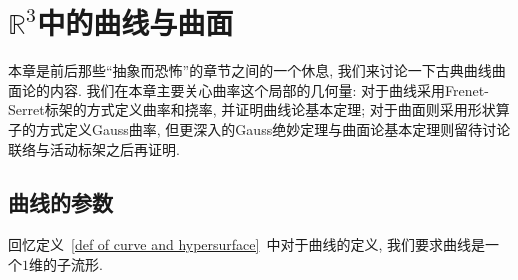 \chapter{\texorpdfstring{$\mathbb{R}^3$}{R³}中的曲线与曲面}\label{chapter_curvesurface}
本章是前后那些``抽象而恐怖''的章节之间的一个休息, 我们来讨论一下古典曲线曲面论的内容.
我们在本章主要关心曲率这个局部的几何量:
对于曲线采用Frenet-Serret标架的方式定义曲率和挠率, 并证明曲线论基本定理;
对于曲面则采用形状算子的方式定义Gauss曲率, 但更深入的Gauss绝妙定理与曲面论基本定理则留待讨论联络与活动标架之后再证明.

\section{曲线的参数}
回忆定义~\ref{def of curve and hypersurface}~中对于曲线的定义, 我们要求曲线是一个$1$维的子流形.
